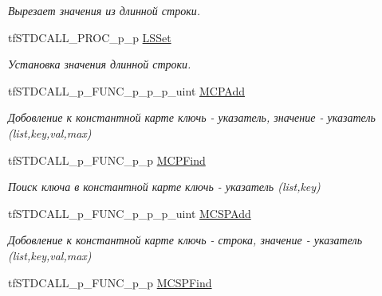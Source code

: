 \begin{DoxyCompactItemize}
\begin{DoxyCompactList}\small\item\em Вырезает значения из длинной строки. \end{DoxyCompactList}\item 
\hypertarget{structs_functions_array_c_p_u_a0d1d74bc5a13f8e55dd74378654b6a9d}{tf\-S\-T\-D\-C\-A\-L\-L\-\_\-\-P\-R\-O\-C\-\_\-p\-\_\-p \hyperlink{structs_functions_array_c_p_u_a0d1d74bc5a13f8e55dd74378654b6a9d}{L\-S\-Set}}\label{structs_functions_array_c_p_u_a0d1d74bc5a13f8e55dd74378654b6a9d}

\begin{DoxyCompactList}\small\item\em Установка значения длинной строки. \end{DoxyCompactList}\item 
\hypertarget{structs_functions_array_c_p_u_afee6b3df2f2ec988583b5a7bf2070a88}{tf\-S\-T\-D\-C\-A\-L\-L\-\_\-p\-\_\-\-F\-U\-N\-C\-\_\-p\-\_\-p\-\_\-p\-\_\-uint \hyperlink{structs_functions_array_c_p_u_afee6b3df2f2ec988583b5a7bf2070a88}{M\-C\-P\-Add}}\label{structs_functions_array_c_p_u_afee6b3df2f2ec988583b5a7bf2070a88}

\begin{DoxyCompactList}\small\item\em Добовление к константной карте ключь -\/ указатель, значение -\/ указатель (list,key,val,max) \end{DoxyCompactList}\item 
\hypertarget{structs_functions_array_c_p_u_a1104bc5769f78acb8cfa2d209684a4a3}{tf\-S\-T\-D\-C\-A\-L\-L\-\_\-p\-\_\-\-F\-U\-N\-C\-\_\-p\-\_\-p \hyperlink{structs_functions_array_c_p_u_a1104bc5769f78acb8cfa2d209684a4a3}{M\-C\-P\-Find}}\label{structs_functions_array_c_p_u_a1104bc5769f78acb8cfa2d209684a4a3}

\begin{DoxyCompactList}\small\item\em Поиск ключа в константной карте ключь -\/ указатель (list,key) \end{DoxyCompactList}\item 
\hypertarget{structs_functions_array_c_p_u_a60f5b7bf2ffc72fffde3bb5de633eeca}{tf\-S\-T\-D\-C\-A\-L\-L\-\_\-p\-\_\-\-F\-U\-N\-C\-\_\-p\-\_\-p\-\_\-p\-\_\-uint \hyperlink{structs_functions_array_c_p_u_a60f5b7bf2ffc72fffde3bb5de633eeca}{M\-C\-S\-P\-Add}}\label{structs_functions_array_c_p_u_a60f5b7bf2ffc72fffde3bb5de633eeca}

\begin{DoxyCompactList}\small\item\em Добовление к константной карте ключь -\/ строка, значение -\/ указатель (list,key,val,max) \end{DoxyCompactList}\item 
\hypertarget{structs_functions_array_c_p_u_a2bc38e810846bc338121d208f8447666}{tf\-S\-T\-D\-C\-A\-L\-L\-\_\-p\-\_\-\-F\-U\-N\-C\-\_\-p\-\_\-p \hyperlink{structs_functions_array_c_p_u_a2bc38e810846bc338121d208f8447666}{M\-C\-S\-P\-Find}}\label{structs_functions_array_c_p_u_a2bc38e810846bc338121d208f8447666}


\end{DoxyCompactItemize}
